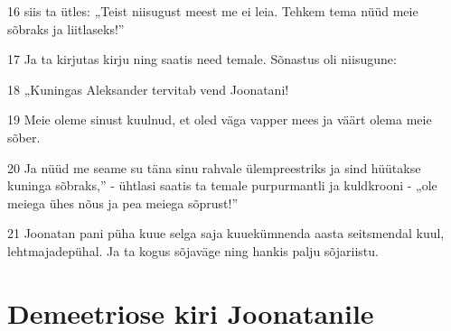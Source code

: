\par 16 siis ta ütles: „Teist niisugust meest me ei leia. Tehkem tema nüüd meie sõbraks ja liitlaseks!”
\par 17 Ja ta kirjutas kirju ning saatis need temale. Sõnastus oli niisugune:
\par 18 „Kuningas Aleksander tervitab vend Joonatani!
\par 19 Meie oleme sinust kuulnud, et oled väga vapper mees ja väärt olema meie sõber.
\par 20 Ja nüüd me seame su täna sinu rahvale ülempreestriks ja sind hüütakse kuninga sõbraks,” - ühtlasi saatis ta temale purpurmantli ja kuldkrooni - „ole meiega ühes nõus ja pea meiega sõprust!”
\par 21 Joonatan pani püha kuue selga saja kuuekümnenda aasta seitsmendal kuul, lehtmajadepühal. Ja ta kogus sõjaväge ning hankis palju sõjariistu. 

\section*{Demeetriose kiri Joonatanile}

